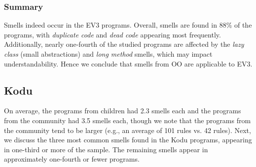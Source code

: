 \documentclass[conference]{IEEEtran}
\newcommand{\mbs}{\textsc{my blocks}}
\newcommand{\mb}{\textsc{my block}}
\begin{document}

\subsubsection{Summary}
Smells indeed occur in the EV3 programs. Overall, smells are found in 88\% of the programs, with \emph{duplicate code} and \emph{dead code} appearing most frequently. Additionally, nearly one-fourth of the studied programs are affected by the  \emph{lazy class} (small abstractions)  and \emph{long method} smells, which may impact understandability.  Hence we conclude that smells from OO are applicable to EV3. %


\subsection{Kodu}
On average, the programs from children had 2.3 smells each and the programs from the community had 3.5 smells each, though we note that the programs from the community tend to be larger (e.g., an average of 101 rules vs. 42 rules). Next, we discuss the three most common smells found in the Kodu programs, appearing in one-third or more of the sample. The remaining smells appear in approximately one-fourth or fewer programs. 
\end{document}
